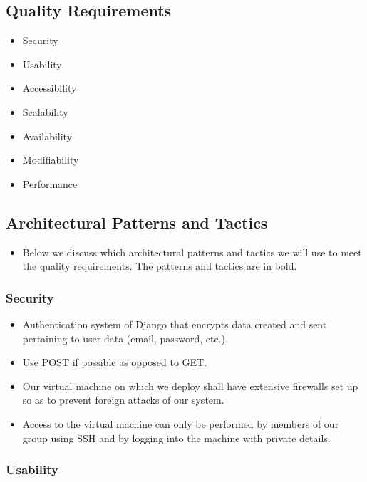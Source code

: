 \documentclass[12pt]{article}
\begin{document}
\subsection*{Quality Requirements}
\begin{itemize}
\item Security
\item Usability
\item Accessibility
\item Scalability
\item Availability
\item Modifiability
\item Performance
\end{itemize}

\subsection*{Architectural Patterns and Tactics}
\begin{itemize}
  \item Below we discuss which architectural patterns and tactics we will use to meet the quality requirements. The patterns and tactics are in bold.
\end{itemize}

\subsubsection*{Security}
\begin{itemize}
\item Authentication system of Django that encrypts data created and sent pertaining to user data (email, password, etc.).
\item Use POST if possible as opposed to GET.
\item Our virtual machine on which we deploy shall have extensive firewalls set up so as to prevent foreign attacks of our system.
\item Access to the virtual machine can only be performed by members of our group using SSH and by logging into the machine with private details.
\end{itemize}

\subsubsection*{Usability}
\end{document}
